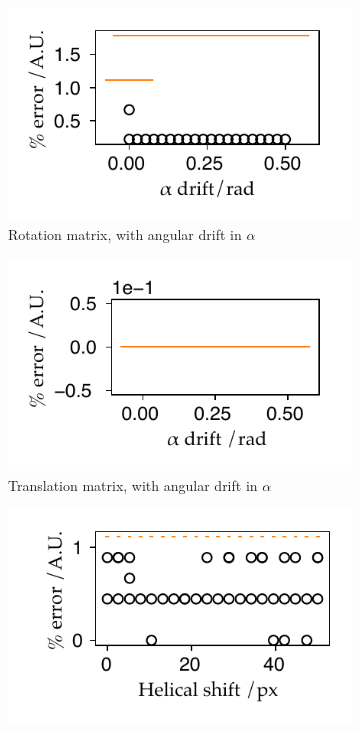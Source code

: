\begin{figure}
  \centering
    \begin{subfigure}[t]{0.5\textwidth}
      \captionsetup{width=0.8\textwidth}
      \centering
      \includegraphics{Chapters/flopt/Figs/PDF/results/helix/decompose/pc_sum_rot_alpha}
      \caption{Rotation matrix, with angular drift in $\alpha$}\label{fig:pc_sum_rot_alpha}
    \end{subfigure}\hfill
    \begin{subfigure}[t]{0.5\textwidth}
      \captionsetup{width=0.8\textwidth}
      \centering
      \includegraphics{Chapters/flopt/Figs/PDF/results/helix/decompose/pc_sum_trans_alpha}
      \caption{Translation matrix, with angular drift in $\alpha$}\label{fig:pc_sum_trans_alpha}
    \end{subfigure}
    \bigskip
        \begin{subfigure}[t]{0.5\textwidth}
          \captionsetup{width=0.8\textwidth}
          \centering
          \includegraphics{Chapters/flopt/Figs/PDF/results/helix/decompose/pc_sum_rot_tx}

\end{subfigure}
\end{figure}
